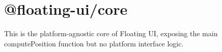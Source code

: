 \chapter{@floating-\/ui/core}
\hypertarget{md__2home_2solype_2delivery_2current__days_2trello_2front_2node__modules_2_0dfloating-ui_2core_2README}{}\label{md__2home_2solype_2delivery_2current__days_2trello_2front_2node__modules_2_0dfloating-ui_2core_2README}
\label{md__2home_2solype_2delivery_2current__days_2trello_2front_2node__modules_2_0dfloating-ui_2core_2README_autotoc_md7878}%
%
 This is the platform-\/agnostic core of Floating UI, exposing the main {\ttfamily compute\+Position} function but no platform interface logic. 